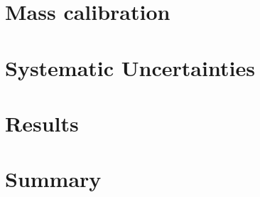 \section{Mass calibration}
\label{s_top_mass:calibration}

\section{Systematic Uncertainties}
\label{s_top_mass:systematics}

\section{Results}
\label{s_top_mass:results}

\section{Summary}
\label{s_top_mass:summary}




